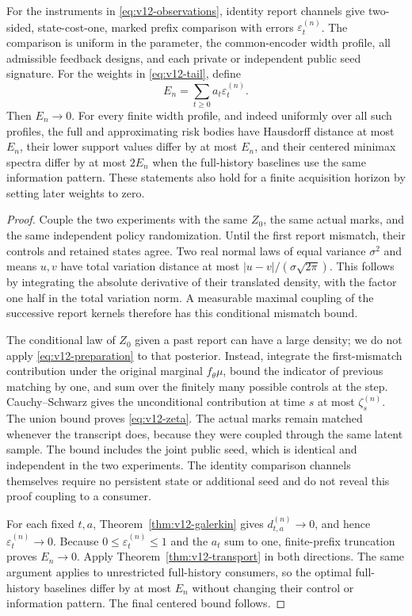 \begin{theorem}
\label{thm:v12-physical}
For the instruments in \eqref{eq:v12-observations}, identity report
channels give two-sided, state-cost-one, marked prefix comparison with
errors $\varepsilon_t^{(n)}$. The comparison is uniform in the parameter,
the common-encoder width profile, all admissible feedback designs, and
each private or independent public seed signature.
For the weights in \eqref{eq:v12-tail}, define
\begin{equation}
 E_n=\sum_{t\ge0}a_t\varepsilon_t^{(n)}.
 \label{eq:v12-physical-error}
\end{equation}
Then $E_n\to0$. For every finite width profile, and indeed uniformly over
all such profiles, the full and approximating risk bodies have Hausdorff
distance at most $E_n$, their lower support values differ by at most
$E_n$, and their centered minimax spectra differ by at most $2E_n$ when
the full-history baselines use the same information pattern. These
statements also hold for a finite acquisition horizon by setting later
weights to zero.
\end{theorem}

\begin{proof}
Couple the two experiments with the same $Z_0$, the same actual marks,
and the same independent policy randomization. Until the first report
mismatch, their controls and retained states agree. Two real normal laws
of equal variance $\sigma^2$ and means $u,v$ have total variation distance
at most $|u-v|/(\sigma\sqrt{2\pi})$. This follows by integrating the
absolute derivative of their translated density, with the factor one
half in the total variation norm. A measurable maximal coupling of the
successive report kernels therefore has this conditional mismatch bound.

The conditional law of $Z_0$ given a past report can have a large density;
we do not apply \eqref{eq:v12-preparation} to that posterior. Instead,
integrate the first-mismatch contribution under the original marginal
$f_\theta\mu$, bound the indicator of previous matching by one, and
sum over the finitely many possible controls at the step. Cauchy--Schwarz
gives the unconditional contribution at time $s$ at most
$\zeta_s^{(n)}$. The union bound proves \eqref{eq:v12-zeta}. The actual
marks remain matched whenever the transcript does, because they were
coupled through the same latent sample. The bound includes the joint
public seed, which is identical and independent in the two experiments.
The identity comparison channels themselves require no persistent state
or additional seed and do not reveal this proof coupling to a consumer.

For each fixed $t,a$, Theorem~\ref{thm:v12-galerkin} gives
$d_{t,a}^{(n)}\to0$, and hence $\varepsilon_t^{(n)}\to0$.
Because $0\le\varepsilon_t^{(n)}\le1$ and the $a_t$ sum to one,
finite-prefix truncation proves $E_n\to0$. Apply
Theorem~\ref{thm:v12-transport} in both directions. The same argument
applies to unrestricted full-history consumers, so the optimal
full-history baselines differ by at most $E_n$ without changing their
control or information pattern. The final centered bound follows.
\end{proof}

